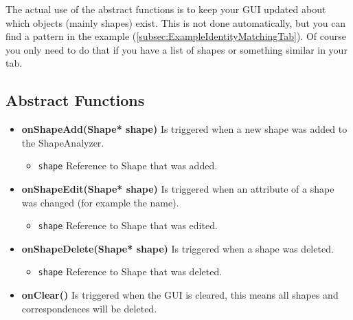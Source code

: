 \begin{mdframed}
	The actual use of the abstract functions is to keep your GUI updated about which objects (mainly shapes) exist. This is not done automatically, but you can find a pattern in the example (\ref{subsec:ExampleIdentityMatchingTab}). Of course you only need to do that if you have a list of shapes or something similar in your tab.
\end{mdframed}

\subsection{Abstract Functions}

\begin{itemize}
	\item \textbf{onShapeAdd(Shape* shape)} Is triggered when a new shape was added to the ShapeAnalyzer. 
	\begin{itemize}
		\item \texttt{shape} Reference to Shape that was added. 
	\end{itemize}
\end{itemize}

\begin{itemize}
	\item \textbf{onShapeEdit(Shape* shape)} Is triggered when an attribute of a shape was changed (for example the name).
	\begin{itemize}
		\item \texttt{shape} Reference to Shape that was edited. 
	\end{itemize}
\end{itemize}

\begin{itemize}
	\item \textbf{onShapeDelete(Shape* shape)} Is triggered when a shape was deleted.
	\begin{itemize}
		\item \texttt{shape} Reference to Shape that was deleted. 
	\end{itemize}
\end{itemize}

\begin{itemize}
	\item \textbf{onClear()} Is triggered when the GUI is cleared, this means all shapes and correspondences will be deleted.
\end{itemize}

